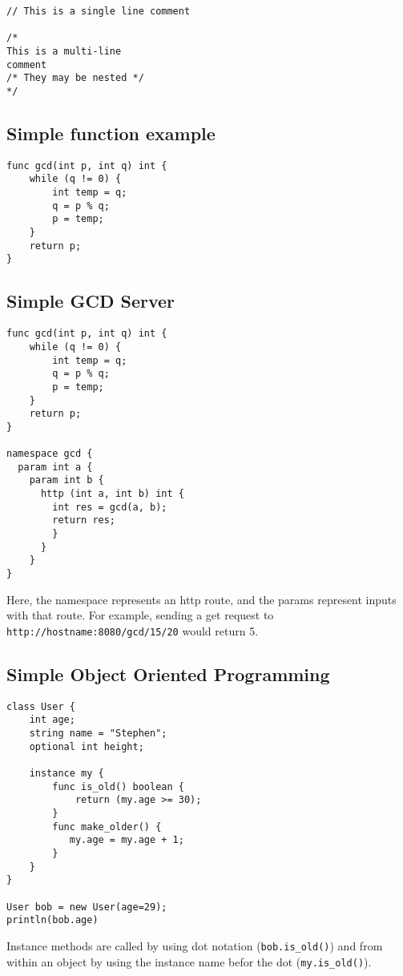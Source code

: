 \begin{verbatim}
// This is a single line comment

/*
This is a multi-line
comment
/* They may be nested */
*/
\end{verbatim}

\subsection*{Simple function example}\label{simple-function-example}

\begin{verbatim}
func gcd(int p, int q) int {
    while (q != 0) {
        int temp = q;
        q = p % q;
        p = temp;
    }
    return p;
}
\end{verbatim}

\subsection*{Simple GCD Server}\label{simple-gcd-server}

\begin{verbatim}
func gcd(int p, int q) int {
    while (q != 0) {
        int temp = q;
        q = p % q;
        p = temp;
    }
    return p;
}

namespace gcd {
  param int a {
    param int b {
      http (int a, int b) int {
        int res = gcd(a, b);
        return res;
        }
      }
    }
}
\end{verbatim}

Here, the namespace represents an http route, and the params represent
inputs with that route. For example, sending a get request to
\texttt{http://hostname:8080/gcd/15/20} would return 5.

\subsection*{Simple Object Oriented
Programming}\label{simple-object-oriented-programming}

\begin{verbatim}
class User {
    int age;
    string name = "Stephen";
    optional int height;

    instance my {
        func is_old() boolean {
            return (my.age >= 30);
        }
        func make_older() {
           my.age = my.age + 1;
        }
    }
}

User bob = new User(age=29);
println(bob.age)
\end{verbatim}

Instance methods are called by using dot notation
(\texttt{bob.is\_old()}) and from within an object by using the instance
name befor the dot (\texttt{my.is\_old()}).
